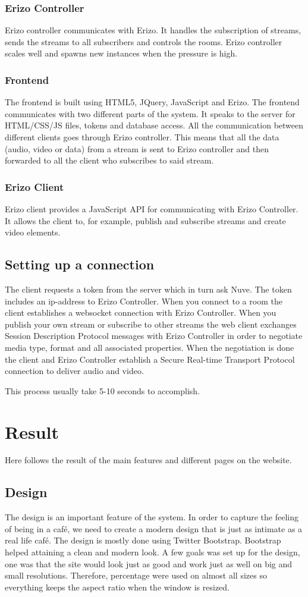 \documentclass[12pt, titlepage]{article}
\begin{document}
\subsubsection{Erizo Controller}
Erizo controller communicates with Erizo. It handles the subscription of streams, sends the streams to all subscribers and controls the rooms. Erizo controller scales well and spawns new instances when the pressure is high.
\subsubsection{Frontend}
The frontend is built using HTML5, JQuery, JavaScript and Erizo. The frontend communicates with two different parts of the system. It speaks to the server for HTML/CSS/JS files, tokens and database access. All the communication between different clients goes through Erizo controller. This means that all the data (audio, video or data) from a stream is sent to Erizo controller and then forwarded to all the client who subscribes to said stream.
\subsubsection{Erizo Client}
Erizo client provides a JavaScript API for communicating with Erizo Controller. It allows the client to, for example, publish and subscribe streams and create video elements.
\subsection{Setting up a connection}
The client requests a token from the server which in turn ask Nuve. The token includes an ip-address to Erizo Controller. When you connect to a room the client establishes a websocket connection with Erizo Controller. When you publish your own stream or subscribe to other streams the web client exchanges Session Description Protocol messages with Erizo Controller in order to negotiate media type, format and all associated properties. When the negotiation is done the client and Erizo Controller establish a Secure Real-time Transport Protocol connection to deliver audio and video.

This process usually take 5-10 seconds to accomplish.
\section{Result}
Here follows the result of the main features and different pages on the website.
\subsection{Design}
The design is an important feature of the system. In order to capture the feeling of being in a café, we need to create a modern design that is just as intimate as a real life café. The design is mostly done using Twitter Bootstrap. Bootstrap helped attaining a clean and modern look. A few goals was set up for the design, one was that the site would look just as good and work just as well on big and small resolutions. Therefore, percentage were used on almost all sizes so everything keeps the aspect ratio when the window is resized. 
\end{document}
